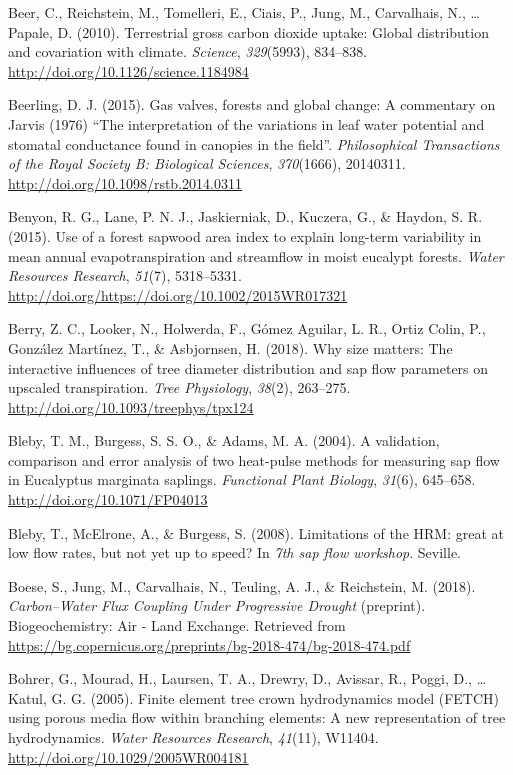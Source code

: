 \documentclass[11pt,twoside]{reedthesis}
\begin{document}
\hypertarget{ref-Beer2010}{}
Beer, C., Reichstein, M., Tomelleri, E., Ciais, P., Jung, M.,
Carvalhais, N., \ldots{} Papale, D. (2010). Terrestrial gross carbon
dioxide uptake: Global distribution and covariation with climate.
\emph{Science}, \emph{329}(5993), 834--838.
\url{http://doi.org/10.1126/science.1184984}

\hypertarget{ref-beerling_gas_2015}{}
Beerling, D. J. (2015). Gas valves, forests and global change: A
commentary on Jarvis (1976) ``The interpretation of the variations in
leaf water potential and stomatal conductance found in canopies in the
field''. \emph{Philosophical Transactions of the Royal Society B:
Biological Sciences}, \emph{370}(1666), 20140311.
\url{http://doi.org/10.1098/rstb.2014.0311}

\hypertarget{ref-Benyon2015}{}
Benyon, R. G., Lane, P. N. J., Jaskierniak, D., Kuczera, G., \& Haydon,
S. R. (2015). Use of a forest sapwood area index to explain long-term
variability in mean annual evapotranspiration and streamflow in moist
eucalypt forests. \emph{Water Resources Research}, \emph{51}(7),
5318--5331. \url{http://doi.org/https://doi.org/10.1002/2015WR017321}

\hypertarget{ref-berry2018}{}
Berry, Z. C., Looker, N., Holwerda, F., Gómez Aguilar, L. R., Ortiz
Colin, P., González Martínez, T., \& Asbjornsen, H. (2018). Why size
matters: The interactive influences of tree diameter distribution and
sap flow parameters on upscaled transpiration. \emph{Tree Physiology},
\emph{38}(2), 263--275. \url{http://doi.org/10.1093/treephys/tpx124}

\hypertarget{ref-Bleby2004}{}
Bleby, T. M., Burgess, S. S. O., \& Adams, M. A. (2004). A validation,
comparison and error analysis of two heat-pulse methods for measuring
sap flow in Eucalyptus marginata saplings. \emph{Functional Plant
Biology}, \emph{31}(6), 645--658. \url{http://doi.org/10.1071/FP04013}

\hypertarget{ref-Bleby2008}{}
Bleby, T., McElrone, A., \& Burgess, S. (2008). Limitations of the HRM:
great at low flow rates, but not yet up to speed? In \emph{7th sap flow
workshop}. Seville.

\hypertarget{ref-boese_carbonwater_2018}{}
Boese, S., Jung, M., Carvalhais, N., Teuling, A. J., \& Reichstein, M.
(2018). \emph{Carbon--Water Flux Coupling Under Progressive Drought}
(preprint). Biogeochemistry: Air - Land Exchange. Retrieved from
\url{https://bg.copernicus.org/preprints/bg-2018-474/bg-2018-474.pdf}

\hypertarget{ref-Bohrer2005}{}
Bohrer, G., Mourad, H., Laursen, T. A., Drewry, D., Avissar, R., Poggi,
D., \ldots{} Katul, G. G. (2005). Finite element tree crown
hydrodynamics model (FETCH) using porous media flow within branching
elements: A new representation of tree hydrodynamics. \emph{Water
Resources Research}, \emph{41}(11), W11404.
\url{http://doi.org/10.1029/2005WR004181}
\end{document}
